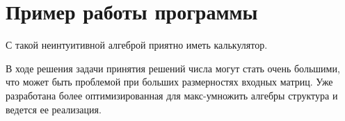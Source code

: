 \documentclass[specialist, substylefile = spbureport.rtx,
    subf,href,colorlinks=true, 12pt]{disser}
\begin{document}


    \section{Пример работы программы}
        

    



    \conclusion

    С такой неинтуитивной алгеброй приятно иметь калькулятор.
    
    В ходе решения задачи принятия решений числа могут стать очень большими, что может быть проблемой при больших размерностях входных матриц. Уже разработана более оптимизированная для макс-умножить алгебры структура и ведется ее реализация.



    \renewcommand{\refname}{}
    \vspace{-25pt}
    
    
\end{document}
